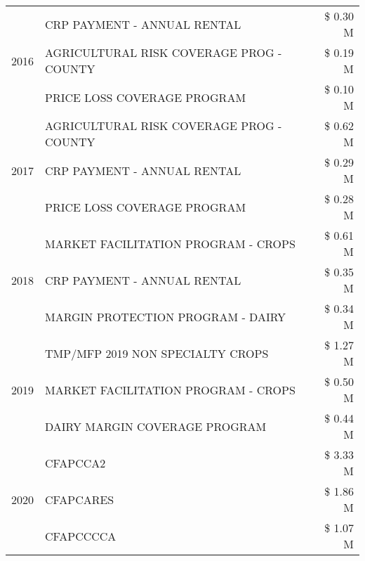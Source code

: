 \begin{tabular}{llr}
\cline{1-3}
\multirow[t]{3}{*}{2016} & CRP PAYMENT - ANNUAL RENTAL & \$ 0.30 M \\
 & AGRICULTURAL RISK COVERAGE PROG - COUNTY & \$ 0.19 M \\
 & PRICE LOSS COVERAGE PROGRAM & \$ 0.10 M \\
\cline{1-3}
\multirow[t]{3}{*}{2017} & AGRICULTURAL RISK COVERAGE PROG - COUNTY & \$ 0.62 M \\
 & CRP PAYMENT - ANNUAL RENTAL & \$ 0.29 M \\
 & PRICE LOSS COVERAGE PROGRAM & \$ 0.28 M \\
\cline{1-3}
\multirow[t]{3}{*}{2018} & MARKET FACILITATION PROGRAM - CROPS & \$ 0.61 M \\
 & CRP PAYMENT - ANNUAL RENTAL & \$ 0.35 M \\
 & MARGIN PROTECTION PROGRAM - DAIRY & \$ 0.34 M \\
\cline{1-3}
\multirow[t]{3}{*}{2019} & TMP/MFP 2019 NON SPECIALTY CROPS & \$ 1.27 M \\
 & MARKET FACILITATION PROGRAM - CROPS & \$ 0.50 M \\
 & DAIRY MARGIN COVERAGE PROGRAM & \$ 0.44 M \\
\cline{1-3}
\multirow[t]{3}{*}{2020} & CFAPCCA2 & \$ 3.33 M \\
 & CFAPCARES & \$ 1.86 M \\
 & CFAPCCCCA & \$ 1.07 M \\
\cline{1-3}
\bottomrule
\end{tabular}
